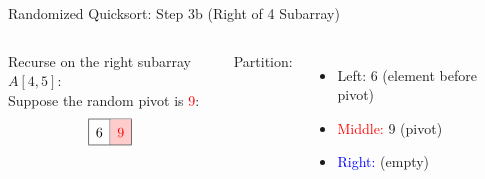 \begin{frame}{Randomized Quicksort: Step 3b (Right of 4 Subarray)}


  \begin{columns}[t]
    Recurse on the right subarray $A[4,5]$:
    \\[0.5em]

    Suppose the random pivot is \textcolor{red}{9}:
    \[
      \renewcommand{\arraystretch}{1.5}
      \begin{array}{|c|c|}
        \hline
        6 & \cellcolor{red!20}\textcolor{red}{9} \\
        \hline
      \end{array}
    \]

    Partition:
    \begin{itemize}
      \item \textcolor{green!60!black}{Left:} 6 (element before pivot)
      \item \textcolor{red}{Middle:} 9 (pivot)
      \item \textcolor{blue}{Right:} (empty)
    \end{itemize}
    \begin{minipage}[t]{\linewidth}
      \vspace{0pt} %
      \begin{center}


\end{center}
\end{minipage}
\end{columns}
\end{frame}
